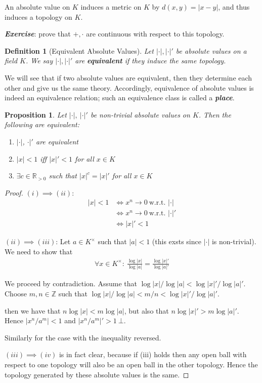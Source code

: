 \documentclass[]{article}
\theoremstyle{custhm}
\theoremstyle{cusdef}
\newtheorem{defin}[theorem]{Definition}
\theoremstyle{custhm}
\theoremstyle{custhm}
\theoremstyle{custhm}
\newtheorem{prop}[theorem]{Proposition}
\theoremstyle{custhm}
\theoremstyle{cusdef}
\theoremstyle{remark}
\newcommand{\Z}{\mathbb{Z}}
\newcommand{\R}{\mathbb{R}}
\newcommand{\ra}{\rightarrow}
\newcommand{\undf}[1]{\textit{\textbf{#1}}}
\begin{document}
An absolute value on $K$ induces a metric on $K$ by $d(x,y) = |x-y|$, and thus induces a topology on $K$.

\undf{Exercise}: prove that $+,\cdot$ are continuous with respect to this topology.

\begin{defin}[Equivalent Absolute Values]
Let $|\cdot|,|\cdot|'$ be absolute values on a field $K$. We say $|\cdot|,|\cdot|'$ are \undf{equivalent} if they induce the same topology.
\end{defin}

We will see that if two absolute values are equivalent, then they determine each other and give us the same theory. Accordingly, equivalence of absolute values is indeed an equivalence relation; such an equivalence class is called a \undf{place}.

\begin{prop}
	Let $|\cdot|,\ |\cdot|'$ be non-trivial absolute values on $K$. Then the following are equivalent:
	\begin{enumerate}[label = (\roman*)]
		\item $|\cdot|$, $\cdot|'$ are equivalent
		\item $|x| < 1$ iff $|x|' < 1$ for all $x \in K$
		\item $\exists c\in\R_{>0}$ such that $|x|^c = |x|'$ for all $x\in K$
	\end{enumerate}
\end{prop}

\begin{proof}
$(i)\implies (ii)$:
\begin{align*}
|x| < 1 &\iff x^n \ra 0\ \textrm{w.r.t. }|\cdot|\\
&\iff x^n \ra 0\ \textrm{w.r.t. }|\cdot|'\\
&\iff |x|' < 1
\end{align*}

$(ii)\implies (iii)$: Let $a\in K^{\times}$ such that $|a| < 1$ (this exsts since $|\cdot|$ is non-trivial). We need to show that
\begin{align*}
	\forall x\in K^\times:\ \frac{\log|x|}{\log|a|} = \frac{\log|x|'}{\log|a|'}
\end{align*}

We proceed by contradiction. Assume that $\log|x|/\log|a| < \log|x|'/\log|a|'$. Choose $m,n\in\Z$ such that $\log|x|/\log|a| < m/n < \log|x|'/\log|a|'$.

then we have that $n\log|x| < m\log|a|$, but also that $n\log|x|' > m\log|a|'$. Hence $|x^n/a^m| < 1$ and $|x^n/a^m|' > 1\  \bot$.

Similarly for the case with the inequality reversed.

$(iii)\implies (iv)$ is in fact clear, because if (iii) holds then any open ball with respect to one topology will also be an open ball in the other topology. Hence the topology generated by these absolute values is the same.
\end{proof}
\end{document}

